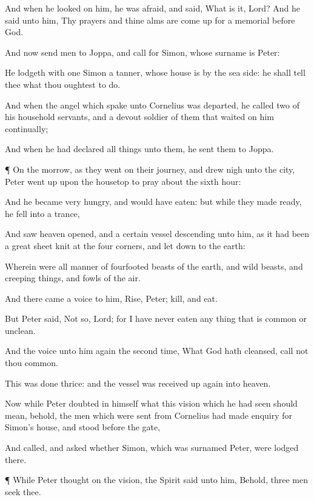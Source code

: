 {And when he
looked on
him, he
was
afraid, and
said,
What is
it,
Lord?
And he
said unto
him,
Thy
prayers
and
thine
alms are come
up
for a
memorial
before
God.

And
now
send
men
to
Joppa,
and call
for
{}
Simon,
whose surname
is
Peter:

He
lodgeth
with
one
Simon a
tanner,
whose
house
is
by the sea
side:
he shall
tell
thee
what
thou
oughtest to
do.

And
when the
angel
which
spake unto
Cornelius was
departed, he
called
two of
his household
servants,
and a
devout
soldier of
them that
waited on
him
continually;

And when he had
declared
all
{}
things unto
them, he
sent
them
to
Joppa.


\par }{\PP {}¶
On the
morrow,
as they went on their
journey,
and drew
nigh unto the
city,
Peter went
up
upon the
housetop to
pray
about the
sixth
hour:

And he
became very
hungry,
and
would have
eaten:
but while
they made
ready,
he
fell
into a
trance,

And
saw
heaven
opened,
and a
certain
vessel
descending
unto
him,
as it had been a
great
sheet
knit at the
four
corners,
and let
down
to the
earth:

Wherein
were all manner
of fourfooted
beasts of the
earth,
and wild
beasts,
and creeping
things,
and
fowls of the
air.

And there
came a
voice
to
him,
Rise,
Peter;
kill,
and
eat.

But
Peter
said, Not
so,
Lord;
for I
have
never
eaten any
thing that is
common
or
unclean.

And the
voice
{}
unto
him
again the second
time,
What
God hath
cleansed,
{}
call
not
thou
common.

This was
done
thrice:
and the
vessel was received
up
again
into
heaven.

Now
while
Peter
doubted
in
himself
what this
vision
which he had
seen should
mean,
behold, the
men
which were
sent
from
Cornelius had made
enquiry for
Simon’s
house,
and
stood
before the
gate,

And
called, and
asked
whether
Simon,
which was
surnamed
Peter, were
lodged
there.


\par }{\PP {}¶
While
Peter
thought
on the
vision, the
Spirit said
unto
him,
Behold,
three
men
seek
thee.

}
